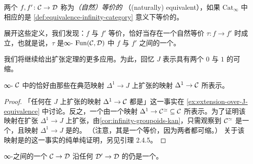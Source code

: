 \begin{definition}\label{def:naturally-equivalent}
两个\trFunctor{} $f, f'\colon \mathcal{C} \to \mathcal{D}$ 称为\emph{（自然）等价的}%
（(naturally) equivalent），如果 $\mathrm{Cat}_\infty$ 中相应的\trMorphism{}是
\cref{def:equivalence-infinity-category} 意义下等价的。
\end{definition}

\begin{remark}\label{rem:equivalent-unwinding}
展开这些定义，我们发现：$f$ 与 $f'$ 等价，恰好当存在一个自然等价
$\tau\colon f \to f'$ 时成立，也就是说，$\tau$ 是∞-\trCategory{}%
$\mathrm{Fun}(\mathcal{C}, \mathcal{D})$ 中 $f$ 与 $f'$ 之间的一个\trEquivalence{}。
\end{remark}

我们将继续给出\trJoyal{}扩张定理的更多应用。为此，回忆 $J$ 表示具有两个%
\trObject{} $0$ 与 $1$ 的可缩\trGroupoid{}。

\begin{corollary}\label{cor:equivalences-extend-over-j}
∞-\trCategory{} $\mathcal{C}$ 中的\trEquivalence{}恰好由那些在典范映射
$\Delta^1 \to J$ 上扩张的映射 $\Delta^1 \to \mathcal{C}$ 所表示。
\end{corollary}

\begin{proof}
「任何在 $J$ 上扩张的映射 $\Delta^1 \to \mathcal{C}$ 都是\trEquivalence{}」这一事实在
\cref{ex:extension-over-J-equivalence} 中讨论。反之，一个\trEquivalence{}由一个映射
$\Delta^1 \to \mathcal{C}^{\simeq} \subseteq \mathcal{C}$ 所表示。为了证明该映射在扩张
$\Delta^1 \to J$ 上扩张，由\cref{cor:infinity-groupoids-kan}，只需观察到
$\mathcal{C}^{\simeq}$ 是一个\trKanComplex{}，且映射 $\Delta^1 \to J$ 是\trAnodyne{}的。
（注意，其\trGeometricRealization{}是一个\trHomotopy{}等价，因为两者都可缩。）
关于该映射是\trAnodyne{}的这一事实的纯单纯证明，另见引理 2.4.5。
\end{proof}

\begin{corollary}\label{cor:pullback-conservative-inner-fibration}
∞-\trCategories{}之间的一个\trConservative{}\trInnerFibration{} $\mathcal{C} \to \mathcal{D}$ 沿任何%
\trFunctor{} $\mathcal{D}' \to \mathcal{D}$ 的\trPullback{}仍是一个\trConservative{}\trInnerFibration{}。
\end{corollary}

